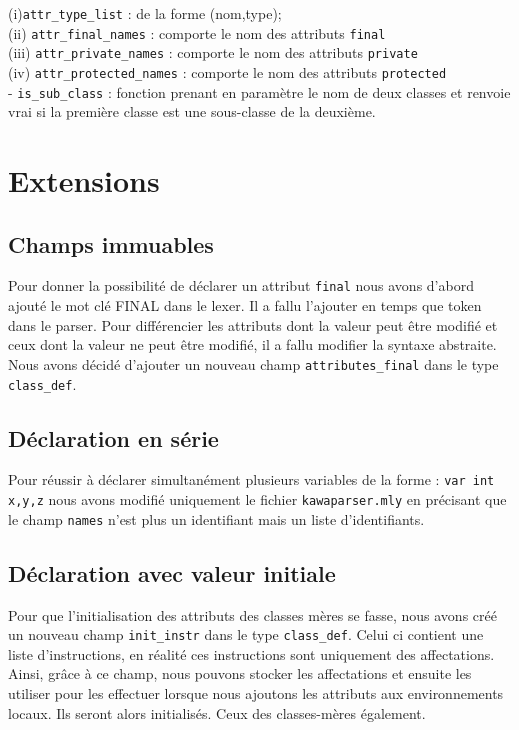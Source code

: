 \documentclass{article}
\begin{document}
(i)\hspace{0.5cm}\texttt{attr\_type\_list} : de la forme (nom,type);\\
(ii)\hspace{0.3cm} \texttt{attr\_final\_names} : comporte le nom des attributs \texttt{final}\\
(iii)\hspace{0.2cm} \texttt{attr\_private\_names} : comporte le nom des attributs \texttt{private}\\
(iv)\hspace{0.2cm} \texttt{attr\_protected\_names} : comporte le nom des attributs \texttt{protected}
\medskip\\
- \texttt{is\_sub\_class} : fonction prenant en paramètre le nom de deux classes et renvoie vrai si la première classe est une sous-classe de la deuxième.
\section{Extensions}
\subsection{Champs immuables}
Pour donner la possibilité de déclarer un attribut \texttt{final} nous avons d'abord ajouté le mot clé FINAL dans le lexer. Il a fallu l'ajouter en temps que token dans le parser. Pour différencier les attributs dont la valeur peut être modifié et ceux dont la valeur ne peut être modifié, il a fallu modifier la syntaxe abstraite. Nous avons décidé d'ajouter un nouveau champ \texttt{attributes\_final} dans le type \texttt{class\_def}.
\subsection{Déclaration en série}
Pour réussir à déclarer simultanément plusieurs variables de la forme : \texttt{var int x,y,z} nous avons modifié uniquement le fichier \texttt{kawaparser.mly} en précisant que le champ \texttt{names} n'est plus un identifiant mais un liste d'identifiants. 
\subsection{Déclaration avec valeur initiale}
Pour que l'initialisation des attributs des classes mères se fasse, nous avons créé un nouveau champ \texttt{init\_instr} dans le type \texttt{class\_def}. Celui ci contient une liste d'instructions, en réalité ces instructions sont uniquement des affectations. Ainsi, grâce à ce champ, nous pouvons stocker les affectations et ensuite les utiliser pour les effectuer lorsque nous ajoutons les attributs aux environnements locaux. Ils seront alors initialisés. Ceux des classes-mères également.\\
\end{document}
